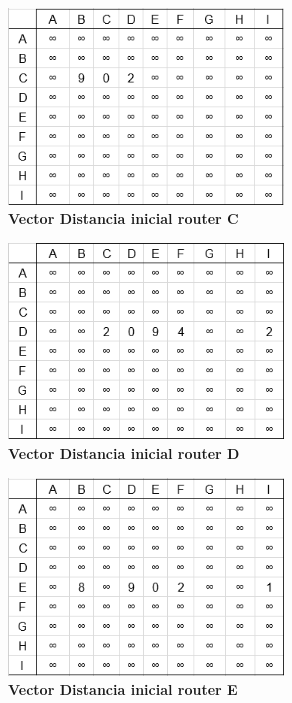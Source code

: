 \documentclass[12pt]{article}
\begin{document}
\begin{figure}[H] 
\centering 
\includegraphics[width=0.65\textwidth]{imagenes/2inicialC.png} \caption{\small \textbf{Vector Distancia inicial router C}}
\label{fig:diagrama_10} 
\end{figure}

\begin{figure}[H] 
\centering 
\includegraphics[width=0.65\textwidth]{imagenes/2inicialD.png} \caption{\small \textbf{Vector Distancia inicial router D}}
\label{fig:diagrama_11} 
\end{figure}

\begin{figure}[H] 
\centering 
\includegraphics[width=0.65\textwidth]{imagenes/2inicialE.png} \caption{\small \textbf{Vector Distancia inicial router E}}
\label{fig:diagrama_12} 
\end{figure}
\end{document}
